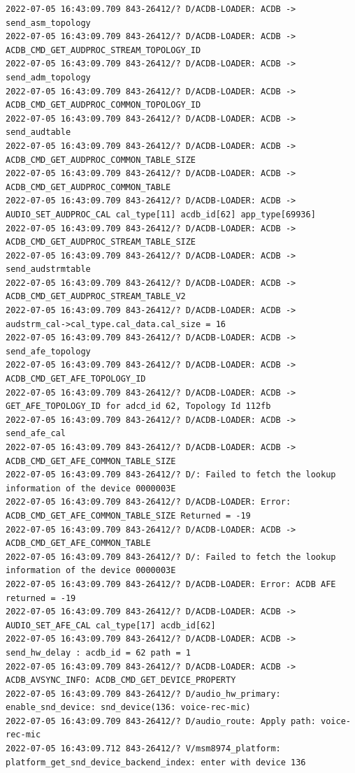 \documentclass[a4paper,12pt]{book}
\begin{document}
\begin{lstlisting}
2022-07-05 16:43:09.709 843-26412/? D/ACDB-LOADER: ACDB -> send_asm_topology
2022-07-05 16:43:09.709 843-26412/? D/ACDB-LOADER: ACDB -> ACDB_CMD_GET_AUDPROC_STREAM_TOPOLOGY_ID
2022-07-05 16:43:09.709 843-26412/? D/ACDB-LOADER: ACDB -> send_adm_topology
2022-07-05 16:43:09.709 843-26412/? D/ACDB-LOADER: ACDB -> ACDB_CMD_GET_AUDPROC_COMMON_TOPOLOGY_ID
2022-07-05 16:43:09.709 843-26412/? D/ACDB-LOADER: ACDB -> send_audtable
2022-07-05 16:43:09.709 843-26412/? D/ACDB-LOADER: ACDB -> ACDB_CMD_GET_AUDPROC_COMMON_TABLE_SIZE
2022-07-05 16:43:09.709 843-26412/? D/ACDB-LOADER: ACDB -> ACDB_CMD_GET_AUDPROC_COMMON_TABLE
2022-07-05 16:43:09.709 843-26412/? D/ACDB-LOADER: ACDB -> AUDIO_SET_AUDPROC_CAL cal_type[11] acdb_id[62] app_type[69936]
2022-07-05 16:43:09.709 843-26412/? D/ACDB-LOADER: ACDB -> ACDB_CMD_GET_AUDPROC_STREAM_TABLE_SIZE
2022-07-05 16:43:09.709 843-26412/? D/ACDB-LOADER: ACDB -> send_audstrmtable
2022-07-05 16:43:09.709 843-26412/? D/ACDB-LOADER: ACDB -> ACDB_CMD_GET_AUDPROC_STREAM_TABLE_V2
2022-07-05 16:43:09.709 843-26412/? D/ACDB-LOADER: ACDB -> audstrm_cal->cal_type.cal_data.cal_size = 16
2022-07-05 16:43:09.709 843-26412/? D/ACDB-LOADER: ACDB -> send_afe_topology
2022-07-05 16:43:09.709 843-26412/? D/ACDB-LOADER: ACDB -> ACDB_CMD_GET_AFE_TOPOLOGY_ID
2022-07-05 16:43:09.709 843-26412/? D/ACDB-LOADER: ACDB -> GET_AFE_TOPOLOGY_ID for adcd_id 62, Topology Id 112fb
2022-07-05 16:43:09.709 843-26412/? D/ACDB-LOADER: ACDB -> send_afe_cal
2022-07-05 16:43:09.709 843-26412/? D/ACDB-LOADER: ACDB -> ACDB_CMD_GET_AFE_COMMON_TABLE_SIZE
2022-07-05 16:43:09.709 843-26412/? D/: Failed to fetch the lookup information of the device 0000003E 
2022-07-05 16:43:09.709 843-26412/? D/ACDB-LOADER: Error: ACDB_CMD_GET_AFE_COMMON_TABLE_SIZE Returned = -19
2022-07-05 16:43:09.709 843-26412/? D/ACDB-LOADER: ACDB -> ACDB_CMD_GET_AFE_COMMON_TABLE
2022-07-05 16:43:09.709 843-26412/? D/: Failed to fetch the lookup information of the device 0000003E 
2022-07-05 16:43:09.709 843-26412/? D/ACDB-LOADER: Error: ACDB AFE returned = -19
2022-07-05 16:43:09.709 843-26412/? D/ACDB-LOADER: ACDB -> AUDIO_SET_AFE_CAL cal_type[17] acdb_id[62]
2022-07-05 16:43:09.709 843-26412/? D/ACDB-LOADER: ACDB -> send_hw_delay : acdb_id = 62 path = 1
2022-07-05 16:43:09.709 843-26412/? D/ACDB-LOADER: ACDB -> ACDB_AVSYNC_INFO: ACDB_CMD_GET_DEVICE_PROPERTY
2022-07-05 16:43:09.709 843-26412/? D/audio_hw_primary: enable_snd_device: snd_device(136: voice-rec-mic)
2022-07-05 16:43:09.709 843-26412/? D/audio_route: Apply path: voice-rec-mic
2022-07-05 16:43:09.712 843-26412/? V/msm8974_platform: platform_get_snd_device_backend_index: enter with device 136

\end{lstlisting}
\end{document}
